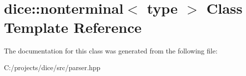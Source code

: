 \hypertarget{classdice_1_1nonterminal}{}\section{dice\+:\+:nonterminal$<$ type $>$ Class Template Reference}
\label{classdice_1_1nonterminal}


The documentation for this class was generated from the following file\+:\begin{DoxyCompactItemize}
\item 
C\+:/projects/dice/src/parser.\+hpp\end{DoxyCompactItemize}
